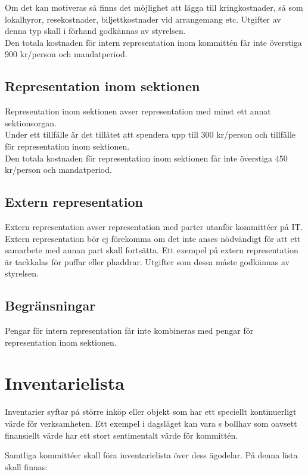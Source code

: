 \documentclass[11pt, includeaddress]{classes/cthit}
\begin{document}
Om det kan motiveras så finns det möjlighet att lägga till kringkostnader, så som lokalhyror, resekostnader, biljettkostnader vid arrangemang etc. Utgifter av denna typ skall i förhand godkännas av styrelsen. \\

Den totala kostnaden för intern representation inom kommittén får inte överstiga 900 kr/person och mandatperiod. 

\subsection{Representation inom sektionen}
Representation inom sektionen avser representation med minst ett annat sektionsorgan. \\

Under ett tillfälle är det tillåtet att spendera upp till 300 kr/person och tillfälle för representation inom sektionen. \\

Den totala kostnaden för representation inom sektionen får inte överstiga 450 kr/person och mandatperiod.

\subsection{Extern representation}
Extern representation avser representation med parter utanför kommittéer på IT. Extern representation bör ej förekomma om det inte anses nödvändigt för att ett samarbete med annan part skall fortsätta. Ett exempel på extern representation är tackkalas för puffar eller phaddrar. Utgifter som dessa måste godkännas av styrelsen.

\subsection{Begränsningar}
Pengar för intern representation får inte kombineras med pengar för representation inom sektionen.


\section{Inventarielista}
Inventarier syftar på större inköp eller objekt som har ett speciellt kontinuerligt värde för verksamheten. Ett exempel i dagsläget kan vara \NOLLKIT{}s bollhav som oavsett finansiellt värde har ett stort sentimentalt värde för kommittén.

Samtliga kommittéer skall föra inventarielista över dess ägodelar. På denna lista skall finnas:
\end{document}
